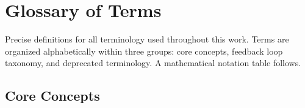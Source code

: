 
\chapter*{Glossary of Terms}
\label{app:glossary}

Precise definitions for all terminology used throughout this work.
Terms are organized alphabetically within three groups: core concepts,
feedback loop taxonomy, and deprecated terminology. A mathematical
notation table follows.

\section*{Core Concepts}

